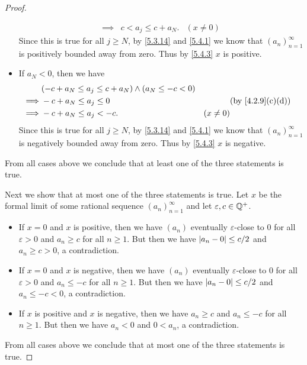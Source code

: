 \begin{proof}
\begin{itemize}
\begin{align*}
            \implies & c < a_j \leq c + a_N.                                   & (x \neq 0)
          \end{align*}
          Since this is true for all \(j \geq N\), by \cref{5.3.14} and \cref{5.4.1} we know that \((a_n)_{n = 1}^\infty\) is positively bounded away from zero.
          Thus by \cref{5.4.3} \(x\) is positive.
    \item If \(a_N < 0\), then we have
          \begin{align*}
                     & (-c + a_N \leq a_j \leq c + a_N) \land (a_N \leq -c < 0)                                \\
            \implies & -c + a_N \leq a_j \leq 0                                 &            & \by{4.2.9}[c,d] \\
            \implies & -c + a_N \leq a_j < -c.                                  & (x \neq 0)
          \end{align*}
          Since this is true for all \(j \geq N\), by \cref{5.3.14} and \cref{5.4.1} we know that \((a_n)_{n = 1}^\infty\) is negatively bounded away from zero.
          Thus by \cref{5.4.3} \(x\) is negative.
  \end{itemize}
  From all cases above we conclude that at least one of the three statements is true.

  Next we show that at most one of the three statements is true.
  Let \(x\) be the formal limit of some rational sequence \((a_n)_{n = 1}^{\infty}\) and let \(\varepsilon, c \in \mathbb{Q}^+\).
  \begin{itemize}
    \item If \(x = 0\) and \(x\) is positive, then we have \((a_n)\) eventually \(\varepsilon\)-close to \(0\) for all \(\varepsilon > 0\) and \(a_n \geq c\) for all \(n \geq 1\).
          But then we have \(\left\lvert a_n - 0\right\rvert \leq c / 2\) and \(a_n \geq c > 0\), a contradiction.
    \item If \(x = 0\) and \(x\) is negative, then we have \((a_n)\) eventually \(\varepsilon\)-close to \(0\) for all \(\varepsilon > 0\) and \(a_n \leq -c\) for all \(n \geq 1\).
          But then we have \(\left\lvert a_n - 0\right\rvert \leq c / 2\) and \(a_n \leq -c < 0\), a contradiction.
    \item If \(x\) is positive and \(x\) is negative, then we have \(a_n \geq c\) and \(a_n \leq -c\) for all \(n \geq 1\).
          But then we have \(a_n < 0\) and \(0 < a_n\), a contradiction.
  \end{itemize}
  From all cases above we conclude that at most one of the three statements is true.


\end{proof}
